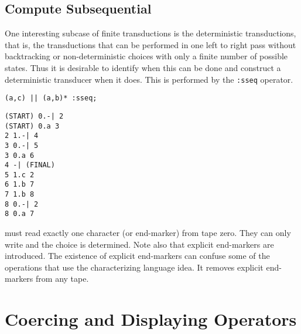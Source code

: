 \subsection{Compute Subsequential}
One interesting subcase of finite transductions is the deterministic
transductions, that is, the transductions that can be performed in one left
to right pass without backtracking or non-deterministic choices with only a
finite number of possible states.
Thus it is desirable to identify when this can be done and construct a
deterministic transducer when it does.
This is performed by the \verb#:sseq# operator.
\begin{center}\begin{minipage}[t]{3in}\begin{minipage}[t]{3in}\begin{tabbing}
\qquad \= \verb#(a,c) || (a,b)* :sseq;#
\end{tabbing}\end{minipage}\end{minipage}
\begin{minipage}[t]{1.6in}\begin{verbatim}
(START) 0.-| 2
(START) 0.a 3
2 1.-| 4
3 0.-| 5
3 0.a 6
4 -| (FINAL)
5 1.c 2
6 1.b 7
7 1.b 8
8 0.-| 2
8 0.a 7
\end{verbatim}\end{minipage}\end{center}
must read exactly one character (or end-marker) from tape zero.
They can only write and the choice is determined.
Note also that explicit end-markers are introduced.
The existence of explicit end-markers can confuse some of the operations
that use the characterizing language idea.
It removes explicit end-markers from any tape.
\section{Coercing and Displaying Operators}
